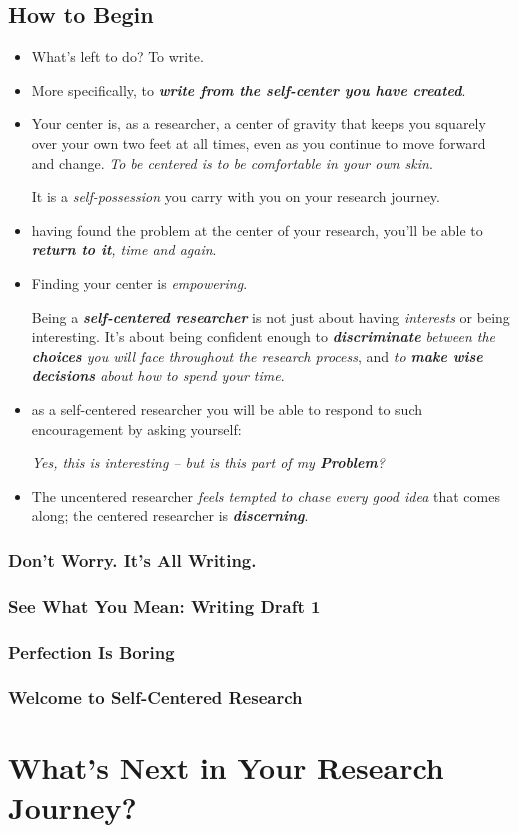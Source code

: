 \documentclass[11pt]{article}
\begin{document}
\subsection{How to Begin}
\begin{itemize}
\item What’s left to do? To write.

\item More specifically, to \emph{\textbf{write from the self-center you have created}}. 

\item  Your center is, as a researcher, a center of gravity that keeps you squarely over your own two feet at all times, even as you continue to move forward and change. \emph{To be centered is to be comfortable in your own skin}.

It is a \emph{self-possession} you carry with you on your research journey.

\item  having found the problem at the center of your research, you’ll be able to \emph{\textbf{return to it}, time and again}.

\item Finding your center is \emph{empowering}. 

Being a \emph{\textbf{self-centered researcher}} is not just about having \emph{interests} or being interesting. It’s about being confident enough to \emph{\textbf{discriminate} between the \textbf{choices} you will face throughout the research process}, and \emph{to \textbf{make wise decisions} about how to spend your time}. 

\item as a self-centered researcher you will be able to respond to such encouragement by asking yourself: 

\emph{Yes, this is interesting -- but is this part of my \textbf{Problem}? }

\item The uncentered researcher \emph{feels tempted to chase every good idea} that comes along; the centered researcher is \emph{\textbf{discerning}}.
\end{itemize}
\subsubsection{Don’t Worry. It’s All Writing.}
\subsubsection{See What You Mean: Writing Draft 1}
\subsubsection{Perfection Is Boring}
\subsubsection{Welcome to Self-Centered Research}

\section{What's Next in Your Research Journey?}


\newpage


\end{document}
